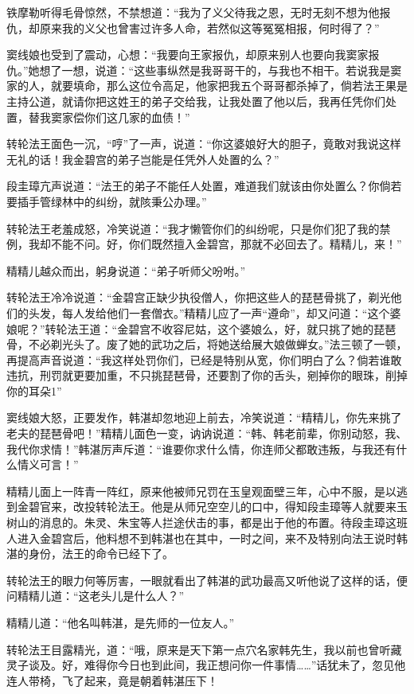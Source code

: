 \documentclass[12pt,oneside]{book}
\begin{document}
铁摩勒听得毛骨惊然，不禁想道：``我为了义父待我之恩，无时无刻不想为他报仇，却原来我的义父也曾害过许多人命，若然似这等冤冤相报，何时得了？''

窦线娘也受到了震动，心想：``我要向王家报仇，却原来别人也要向我窦家报仇。''她想了一想，说道：``这些事纵然是我哥哥干的，与我也不相干。若说我是窦家的人，就要填命，那么这位令高足，他家把我五个哥哥都杀掉了，倘若法王果是主持公道，就请你把这姓王的弟子交给我，让我处置了他以后，我再任凭你们处置，替我窦家偿你们这几家的血债！''

转轮法王面色一沉，``哼''了一声，说道：``你这婆娘好大的胆子，竟敢对我说这样无礼的话！我金碧宫的弟子岂能是任凭外人处置的么？''

段圭璋亢声说道：``法王的弟子不能任人处置，难道我们就该由你处置么？你倘若要插手管绿林中的纠纷，就陔秉公办理。''

转轮法王老羞成怒，冷笑说道：``我才懒管你们的纠纷呢，只是你们犯了我的禁例，我却不能不问。好，你们既然擅入金碧宫，那就不必回去了。精精儿，来！''

精精儿越众而出，躬身说道：``弟子听师父吩咐。''

转轮法王冷冷说道：``金碧宫正缺少执役僧人，你把这些人的琵琶骨挑了，剃光他们的头发，每人发给他们一套僧衣。''精精儿应了一声``遵命''，却又问道：``这个婆娘呢？''转轮法王道：``金碧宫不收容尼姑，这个婆娘么，好，就只挑了她的琵琶骨，不必剃光头了。废了她的武功之后，将她送给展大娘做蝉女。''法三顿了一顿，再提高声音说道：``我这样处罚你们，已经是特别从宽，你们明白了么？倘若谁敢违抗，刑罚就更要加重，不只挑琵琶骨，还要割了你的舌头，剜掉你的眼珠，削掉你的耳朵1''

窦线娘大怒，正要发作，韩湛却忽地迎上前去，冷笑说道：``精精儿，你先来挑了老夫的琵琶骨吧！''精精儿面色一变，讷讷说道：``韩、韩老前辈，你别动怒，我、我代你求情！''韩湛厉声斥道：``谁要你求什么情，你连师父都敢违叛，与我还有什么情义可言！''

精精儿面上一阵青一阵红，原来他被师兄罚在玉皇观面壁三年，心中不服，是以逃到金碧官来，改投转轮法王。他是从师兄空空儿的口中，得知段圭璋等人就要来玉树山的消息的。朱灵、朱宝等人拦途伏击的事，都是出于他的布置。待段圭璋这班人进入金碧宫后，他料想不到韩湛也在其中，一时之间，来不及特别向法王说时韩湛的身份，法王的命令已经下了。

转轮法王的眼力何等厉害，一眼就看出了韩湛的武功最高又听他说了这样的话，便问精精儿道：``这老头儿是什么人？''

精精儿道：``他名叫韩湛，是先师的一位友人。''

转轮法王目露精光，道：``哦，原来是天下第一点穴名家韩先生，我以前也曾听藏灵子谈及。好，难得你今日也到此间，我正想问你一件事情\ldots\ldots{}''话犹未了，忽见他连人带椅，飞了起来，竟是朝着韩湛压下！
\end{document}
